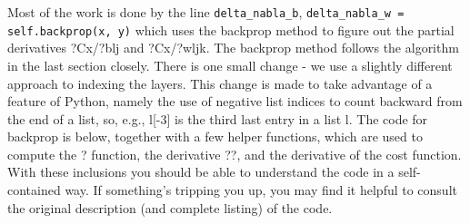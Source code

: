 Most of the work is done by the line \lstinline{delta_nabla_b}, \lstinline{delta_nabla_w = self.backprop(x, y)} which uses the backprop method to figure out the partial derivatives ?Cx/?blj and ?Cx/?wljk. The backprop method follows the algorithm in the last section closely. There is one small change - we use a slightly different approach to indexing the layers. This change is made to take advantage of a feature of Python, namely the use of negative list indices to count backward from the end of a list, so, e.g., l[-3] is the third last entry in a list l. The code for backprop is below, together with a few helper functions, which are used to compute the ? function, the derivative ??, and the derivative of the cost function. With these inclusions you should be able to understand the code in a self-contained way. If something's tripping you up, you may find it helpful to consult the original description (and complete listing) of the code. 

